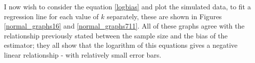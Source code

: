 \documentclass{report}
\begin{document}
I now wish to consider the equation \ref{logbias} and plot the simulated data, to fit a regression line for each value of $k$ separately, these are shown in Figures \ref{normal_graphs16} and \ref{normal_graphs711}. All of these graphs agree with the relationship previously stated between the sample size and the bias of the estimator; they all show that the logarithm of this equations gives a negative linear relationship - with relatively small error bars.

\begin{figure}
\    
\end{figure}
\end{document}

